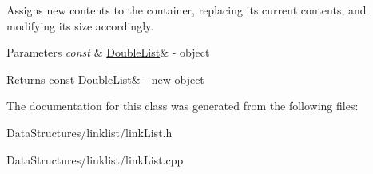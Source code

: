 Assigns new contents to the container, replacing its current contents, and modifying its size accordingly. 


\begin{DoxyParams}{Parameters}
{\em const} & \hyperlink{classDoubleList}{Double\+List}\& -\/ object \\
\hline
\end{DoxyParams}
\begin{DoxyReturn}{Returns}
const \hyperlink{classDoubleList}{Double\+List}\& -\/ new object 
\end{DoxyReturn}


The documentation for this class was generated from the following files\+:\begin{DoxyCompactItemize}
\item 
Data\+Structures/linklist/link\+List.\+h\item 
Data\+Structures/linklist/link\+List.\+cpp\end{DoxyCompactItemize}
